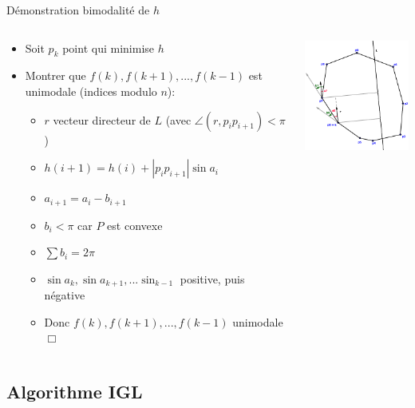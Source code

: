 \documentclass{beamer}
\begin{document}
\begin{frame}{Démonstration bimodalité de $h$}
	\begin{columns}[c]
	\begin{column}[T]{.6\textwidth}
		\begin{itemize}
		\item Soit $p_{k}$ point qui minimise $h$
		\item Montrer que $f(k), f(k+1), ..., f(k-1)$ est unimodale (indices modulo $n$):
			\begin{itemize}
			\item $r$ vecteur directeur de $L$ (avec $\angle(r, p_{i}p_{i+1}) < \pi$)
			\item $h(i+1) = h(i) + |p_{i}p_{i+1}| \sin a_{i}$
			\item $a_{i+1} = a_{i} - b_{i+1}$
			\item $b_{i} < \pi$ car $P$ est convexe
			\item $\sum b_{i} = 2\pi$
			\item $\sin a_{k}, \sin a_{k+1}, ... \sin_{k-1}$ positive, puis négative
			\item Donc $f(k), f(k+1), ..., f(k-1)$ unimodale $\Box$
			\end{itemize}
		\end{itemize}
	\end{column}
	\begin{column}[T]{.4\textwidth}
		\includegraphics[width=5cm]{hBimodal.eps}
	\end{column}
	\end{columns}
\end{frame}


\subsection{Algorithme IGL}
\end{document}

